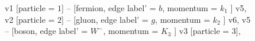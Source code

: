 \documentclass{revtex4}
\begin{document}
\begin{figure}[!htb]
\begin{center}
{    %
v1 [particle = \(1\)] -- [fermion, edge label' = \(b\), momentum = \(k_{1}\) ] v5, 
v2 [particle = \(2\)] -- [gluon, edge label' = \(g\), momentum = \(k_{2}\) ] v6, 
v5 -- [boson, edge label' = \(W^{-}\), momentum = \(K_{3}\) ] v3 [particle = \(3\)], 
}
\end{center}
\end{figure}
\end{document}
